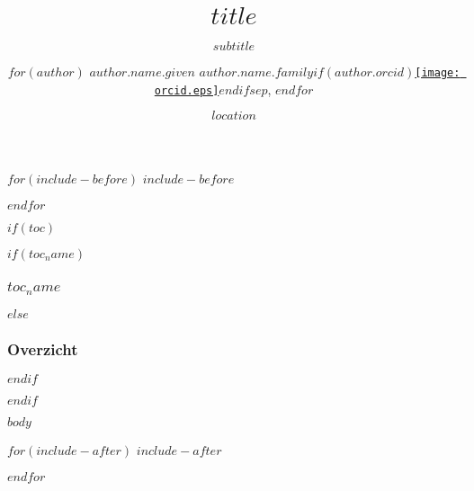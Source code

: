 \documentclass[
  $if(handout)$handout, beameroptions={$endif$ hyperref={colorlinks=true,citecolor=link.colour,linkcolor=link.colour,urlcolor=link.colour},
  $if(fontsize)$$fontsize$$else$10pt$endif$,
  xetex,
  noamsthm$if(aspect)$, aspectratio=$aspect$ $endif$$if(handout)$}$endif$
]{beamer$if(handout)$switch$endif$}
\title{$title$}
\subtitle{$subtitle$}
\author{
$for(author)$
$author.name.given$ $author.name.family$$if(author.orcid)$\href{https://orcid.org/$author.orcid$}{\texttt{[image: orcid.eps]}}$endif$$sep$, $endfor$
}
\institute{$institute$}
\date{$location$}
\date{}
\begin{document}
\begin{frame}[plain, label=intro, noframenumbering]
  \titlepage
\end{frame}

$for(include-before)$
$include-before$

$endfor$

$if(toc)$
\begin{frame}
$if(toc_name)$
  \frametitle{$toc_name$}
$else$
  \frametitle{Overzicht}
$endif$
	\tableofcontents
\end{frame}
$endif$

$body$

$for(include-after)$
$include-after$

$endfor$
\end{document}
